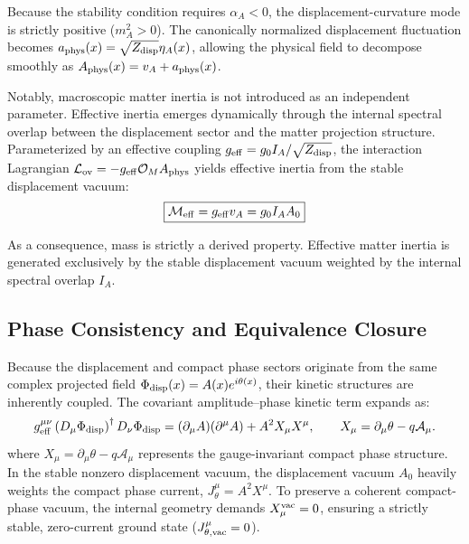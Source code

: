 \documentclass[11pt]{article}
\begin{document}
Because the stability condition requires $\alpha_A < 0$, the displacement-curvature mode is strictly positive ($m_A^2 > 0$). The canonically normalized displacement fluctuation becomes $a_{\rm phys}(x) = \sqrt{Z_{\rm disp}} \eta_A(x)$, allowing the physical field to decompose smoothly as $A_{\rm phys}(x) = v_A + a_{\rm phys}(x)$.

Notably, macroscopic matter inertia is not introduced as an independent parameter. Effective inertia emerges dynamically through the internal spectral overlap between the displacement sector and the matter projection structure. Parameterized by an effective coupling $g_{\rm eff} = g_0 I_A / \sqrt{Z_{\rm disp}}$, the interaction Lagrangian $\mathcal{L}_{\rm ov} = -g_{\rm eff} \mathcal{O}_M A_{\rm phys}$ yields effective inertia from the stable displacement vacuum:
\begin{equation}
\boxed{ \mathcal M_{\rm eff} = g_{\rm eff} v_A = g_0 I_A A_0 }
\end{equation}

As a consequence, mass is strictly a derived property. Effective matter inertia is generated exclusively by the stable displacement vacuum weighted by the internal spectral overlap $I_A$. 

\subsection{Phase Consistency and Equivalence Closure}
\label{sec:phase_consistency_equivalence}

Because the displacement and compact phase sectors originate from the same complex projected field $\Phi_{\rm disp}(x) = A(x)e^{i\theta(x)}$, their kinetic structures are inherently coupled. The covariant amplitude–phase kinetic term expands as:
\begin{equation}
g_{\rm eff}^{\mu\nu}
\left(D_\mu\Phi_{\rm disp}\right)^\dagger
D_\nu\Phi_{\rm disp}
=
(\partial_\mu A)(\partial^\mu A)
+
A^2X_\mu X^\mu,
\qquad
X_\mu=\partial_\mu\theta-q\mathcal A_\mu .
\end{equation}
where $X_\mu = \partial_\mu \theta - q\mathcal A_\mu$ represents the gauge-invariant compact phase structure. In the stable nonzero displacement vacuum, the displacement vacuum $A_0$ heavily weights the compact phase current, $J^\mu_\theta = A^2 X^\mu$. To preserve a coherent compact-phase vacuum, the internal geometry demands $X_\mu^{\rm vac} = 0$, ensuring a strictly stable, zero-current ground state ($J^\mu_{\theta, \rm vac} = 0$).
\end{document}
